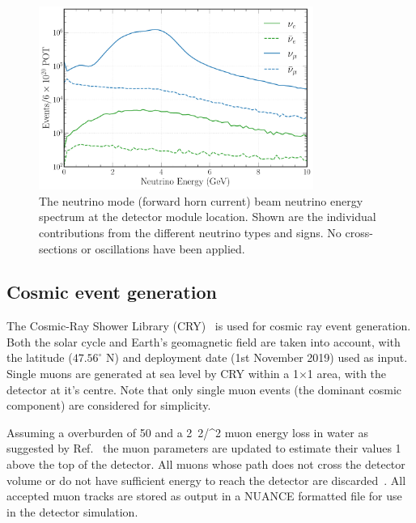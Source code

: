 \begin{figure} %
    \includegraphics[width=0.8\textwidth]{diagrams/4-chips/flux.pdf}
    \caption[\numi neutrino flux at at the \chipsfive detector location]
    {The neutrino mode (forward horn current) \numi beam neutrino energy spectrum at the
        \chipsfive detector module location. Shown are the individual contributions from the
        different neutrino types and signs. No cross-sections or oscillations have been applied.}
    \label{fig:flux}
\end{figure}

\subsection{Cosmic event generation} %
\label{sec:chips_monte_carlo_cosmic} %

The Cosmic-Ray Shower Library (CRY)~\cite{hagmann2012_1, hagmann2012_2} is used for cosmic ray
event generation. Both the solar cycle and Earth's geomagnetic field are taken into account, with
the \chipsfive latitude ($47.56^{\circ}$ N) and deployment date (1st November 2019) used as input.
Single muons are generated at sea level by CRY within a
\unit{1}{}$\times$\unit{1}{} area, with the detector at it's centre. Note
that only single muon events (the dominant cosmic component) are considered for simplicity.

Assuming a \chipsfive overburden of \unit{50}{} and a \unit{2.2}{\MeV/^{2}}
muon energy loss in water as suggested by Ref.~\cite{klimushin2001} the muon parameters are
updated to estimate their values \unit{1}{} above the top of the detector. All muons
whose path does not cross the detector volume or do not have sufficient energy to reach the
detector are discarded~\cite{chipsgen2020}. All accepted muon tracks are stored as output in a
NUANCE formatted file for use in the detector simulation.

